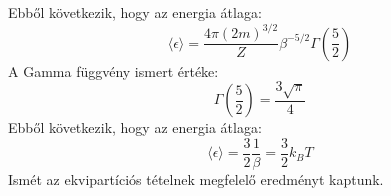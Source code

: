 \documentclass[../main.tex]{subfiles}
\begin{document}
Ebből következik, hogy az energia átlaga:
\begin{equation}
    \langle \epsilon \rangle = \frac{4 \pi (2 m)^{3/2}}{Z} \beta^{-5/2} \Gamma \left( \frac{5}{2} \right)
\end{equation}
A Gamma függvény ismert értéke:
\begin{equation}
    \Gamma \left( \frac{5}{2} \right) = \frac{3 \sqrt{\pi}}{4}
\end{equation}
Ebből következik, hogy az energia átlaga:
\begin{equation}
    \langle \epsilon \rangle = \frac{3}{2} \frac{1}{\beta} = \frac{3}{2} k_B T
\end{equation}
Ismét az ekvipartíciós tételnek megfelelő eredményt kaptunk.
\end{document}
